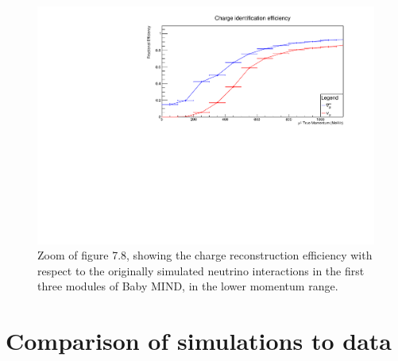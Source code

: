 \begin{figure}[h!]
\centering
\includegraphics[width=.9\textwidth]{figures/NeutrinoChap/NuFactTalk/fix4.pdf}
\caption{Zoom of figure 7.8, showing the charge reconstruction efficiency with respect to the originally simulated neutrino interactions in the first three  modules of Baby MIND, in the lower momentum range.}
\label{fig:IronMINDCombinedZoom}
\end{figure}



\pagebreak
\newpage
\FloatBarrier
\section{Comparison of simulations to data}




